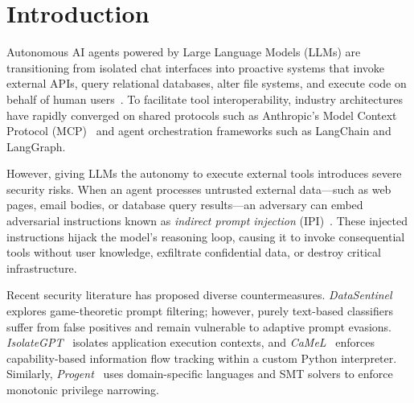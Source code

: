 \documentclass[sigconf,anonymous,review]{acmart}
\begin{document}

\maketitle

\section{Introduction}

Autonomous AI agents powered by Large Language Models (LLMs) are transitioning from isolated chat interfaces into proactive systems that invoke external APIs, query relational databases, alter file systems, and execute code on behalf of human users~\cite{greshake2023not, debenedetti2024agentdojo}. To facilitate tool interoperability, industry architectures have rapidly converged on shared protocols such as Anthropic's Model Context Protocol (MCP)~\cite{mcp2024spec} and agent orchestration frameworks such as LangChain and LangGraph.

However, giving LLMs the autonomy to execute external tools introduces severe security risks. When an agent processes untrusted external data---such as web pages, email bodies, or database query results---an adversary can embed adversarial instructions known as \emph{indirect prompt injection} (IPI)~\cite{greshake2023not}. These injected instructions hijack the model's reasoning loop, causing it to invoke consequential tools without user knowledge, exfiltrate confidential data, or destroy critical infrastructure.

Recent security literature has proposed diverse countermeasures. \emph{DataSentinel}~\cite{liu2025datasentinel} explores game-theoretic prompt filtering; however, purely text-based classifiers suffer from false positives and remain vulnerable to adaptive prompt evasions. \emph{IsolateGPT}~\cite{wu2025isolategpt} isolates application execution contexts, and \emph{CaMeL}~\cite{debenedetti2025camel} enforces capability-based information flow tracking within a custom Python interpreter. Similarly, \emph{Progent}~\cite{shi2025progent} uses domain-specific languages and SMT solvers to enforce monotonic privilege narrowing. 
\end{document}
